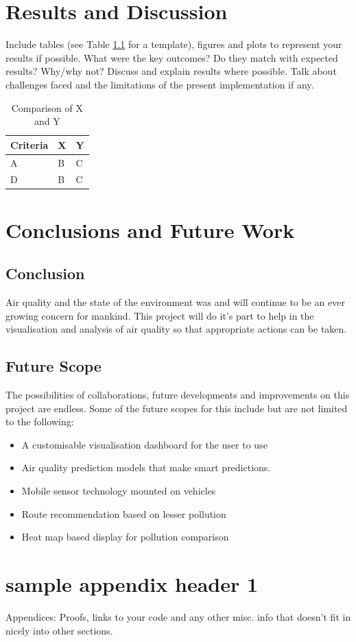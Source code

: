 \documentclass[]{report}
\begin{document}
\chapter{Results and Discussion}
Include tables (see Table \ref{XYComparison} for a template), figures and plots to represent your results if possible. What were the key outcomes? Do they match with expected results? Why/why not? Discuss and explain results where possible. Talk about challenges faced and the limitations of the present implementation if any. 
\begin{table}[ht]
\label{XYComparison}
\begin{center}
\begin{tabular} {l|l|l} %
\hline
\hline
\textbf{Criteria} & \textbf{X} & \textbf{Y}  \\
\hline
A & B & C \\
D & B & C \\
\hline 
\hline
\end{tabular}
\end{center}
\caption{Comparison of  X and Y}
\end{table}

\chapter{Conclusions and Future Work}
\section{Conclusion}
Air quality and the state of the environment was and will continue to be an ever growing concern for mankind. This project will do it's part to help in the visualisation and analysis of air quality so that appropriate actions can be taken.
\section{Future Scope}
The possibilities of collaborations, future developments and improvements on this project are endless. Some of the future scopes for this include but are not limited to the following:
\newline
\begin{itemize}
    \item A customisable visualisation dashboard for the user to use
    \item Air quality prediction models that make smart predictions. 
    \item Mobile sensor technology mounted on vehicles 
    \item Route recommendation based on lesser pollution 
    \item Heat map based display for pollution comparison 

\end{itemize}



 

\appendix 
\chapter{sample appendix header 1}
Appendices: 
Proofs, links to your code and any other misc. info that doesn't fit in nicely into other sections. 
\end{document}
